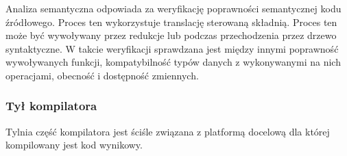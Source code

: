 Analiza semantyczna odpowiada za weryfikację poprawności semantycznej kodu źródłowego. Proces ten wykorzystuje translację sterowaną składnią. Proces ten może być wywoływany przez redukcje lub podczas przechodzenia przez drzewo syntaktyczne. W takcie weryfikacji sprawdzana jest między innymi poprawność wywoływanych funkcji, kompatybilność typów danych z wykonywanymi na nich operacjami, obecność i dostępność zmiennych.

\subsubsection{Tył kompilatora}
Tylnia część kompilatora jest ściśle związana z platformą docelową dla której kompilowany jest kod wynikowy. 

%
%
%




